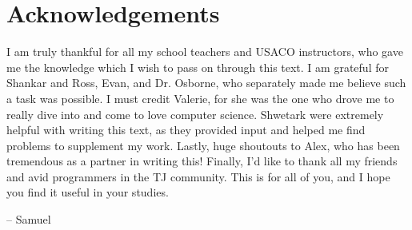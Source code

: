 \chapter{Acknowledgements}

I am truly thankful for all my school teachers and USACO instructors, who gave me the knowledge which I wish to pass on through this text. I am grateful for Shankar and Ross, Evan, and Dr. Osborne, who separately made me believe such a task was possible. I must credit Valerie, for she was the one who drove me to really dive into and come to love computer science. Shwetark were extremely helpful with writing this text, as they provided input and helped me find problems to supplement my work. Lastly, huge shoutouts to Alex, who has been tremendous as a partner in writing this! Finally, I'd like to thank all my friends and avid programmers in the TJ community. This is for all of you, and I hope you find it useful in your studies.

\begin{flushright}
-- Samuel
\end{flushright}